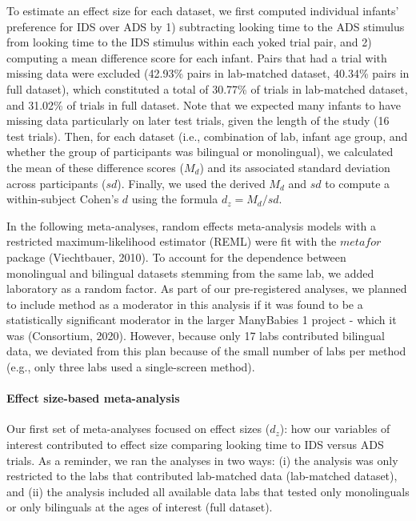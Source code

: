 \documentclass[,man,floatsintext]{apa6}
\let\oldparagraph\paragraph
\renewcommand{\paragraph}[1]{\oldparagraph{#1}\mbox{}}
\begin{document}
To estimate an effect size for each dataset, we first computed individual infants' preference for IDS over ADS by 1) subtracting looking time to the ADS stimulus from looking time to the IDS stimulus within each yoked trial pair, and 2) computing a mean difference score for each infant. Pairs that had a trial with missing data were excluded (42.93\% pairs in lab-matched dataset, 40.34\% pairs in full dataset), which constituted a total of 30.77\% of trials in lab-matched dataset, and 31.02\% of trials in full dataset. Note that we expected many infants to have missing data particularly on later test trials, given the length of the study (16 test trials). Then, for each dataset (i.e., combination of lab, infant age group, and whether the group of participants was bilingual or monolingual), we calculated the mean of these difference scores (\(M_d\)) and its associated standard deviation across participants (\(sd\)). Finally, we used the derived \(M_d\) and \(sd\) to compute a within-subject Cohen's \(d\) using the formula \(d_z = M_d/sd\).

In the following meta-analyses, random effects meta-analysis models with a restricted maximum-likelihood estimator (REML) were fit with the \(metafor\) package (Viechtbauer, 2010). To account for the dependence between monolingual and bilingual datasets stemming from the same lab, we added laboratory as a random factor. As part of our pre-registered analyses, we planned to include method as a moderator in this analysis if it was found to be a statistically significant moderator in the larger ManyBabies 1 project - which it was (Consortium, 2020). However, because only 17 labs contributed bilingual data, we deviated from this plan because of the small number of labs per method (e.g., only three labs used a single-screen method).

\hypertarget{effect-size-based-meta-analysis}{%
\paragraph{Effect size-based meta-analysis}\label{effect-size-based-meta-analysis}}

Our first set of meta-analyses focused on effect sizes (\(d_z\)): how our variables of interest contributed to effect size comparing looking time to IDS versus ADS trials. As a reminder, we ran the analyses in two ways: (i) the analysis was only restricted to the labs that contributed lab-matched data (lab-matched dataset), and (ii) the analysis included all available data labs that tested only monolinguals or only bilinguals at the ages of interest (full dataset).
\end{document}
